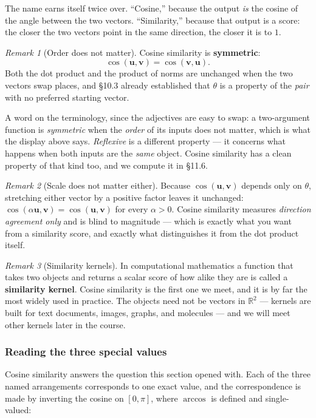 \documentclass[11pt]{article}
\theoremstyle{definition}
\theoremstyle{remark}
\newtheorem*{rmk}{Remark}
\newcommand{\R}{\mathbb{R}}
\newcommand{\vc}[1]{\mathbf{#1}}
\begin{document}
\noindent The name earns itself twice over. ``Cosine,'' because the output
\emph{is} the cosine of the angle between the two vectors. ``Similarity,''
because that output is a score: the closer the two vectors point in the same
direction, the closer it is to $1$.

\begin{rmk}[Order does not matter]
Cosine similarity is \textbf{symmetric}:
\[
  \cos(\vc{u},\vc{v})=\cos(\vc{v},\vc{u}).
\]
Both the dot product and the product of norms are unchanged when the two
vectors swap places, and \S10.3 already established that $\theta$ is a property
of the \emph{pair} with no preferred starting vector.

A word on the terminology, since the adjectives are easy to swap: a
two-argument function is \emph{symmetric} when the \emph{order} of its inputs
does not matter, which is what the display above says. \emph{Reflexive} is a
different property --- it concerns what happens when both inputs are the
\emph{same} object. Cosine similarity has a clean property of that kind too,
and we compute it in \S11.6.
\end{rmk}

\begin{rmk}[Scale does not matter either]
Because $\cos(\vc{u},\vc{v})$ depends only on $\theta$, stretching either vector
by a positive factor leaves it unchanged: $\cos(\alpha\vc{u},\vc{v})
=\cos(\vc{u},\vc{v})$ for every $\alpha>0$. Cosine similarity measures
\emph{direction agreement only} and is blind to magnitude --- which is exactly
what you want from a similarity score, and exactly what distinguishes it from
the dot product itself.
\end{rmk}

\begin{rmk}[Similarity kernels]
In computational mathematics a function that takes two objects and returns a
scalar score of how alike they are is called a \textbf{similarity kernel}.
Cosine similarity is the first one we meet, and it is by far the most widely
used in practice. The objects need not be vectors in $\R^{2}$ --- kernels are
built for text documents, images, graphs, and molecules --- and we will meet
other kernels later in the course.
\end{rmk}

\subsubsection*{Reading the three special values}
Cosine similarity answers the question this section opened with. Each of the
three named arrangements corresponds to one exact value, and the correspondence
is made by inverting the cosine on $[0,\pi]$, where $\arccos$ is defined and
single-valued:
\end{document}
